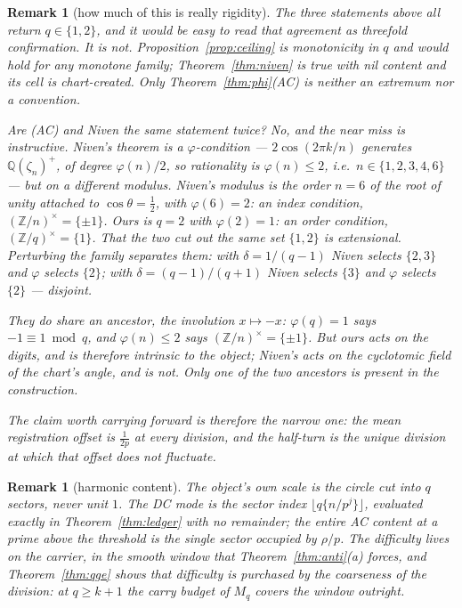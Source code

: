 \documentclass[11pt]{article}
\newtheorem{remark}[theorem]{Remark}
\begin{document}
\begin{remark}[how much of this is really rigidity]\label{rem:deflate}
The three statements above all return $q\in\{1,2\}$, and it would be easy to read that
agreement as threefold confirmation.  It is not.  Proposition~\ref{prop:ceiling} is
monotonicity in $q$ and would hold for any monotone family; Theorem~\ref{thm:niven} is true
with nil content and its cell is chart-created.  Only Theorem~\ref{thm:phi}(AC) is neither an
extremum nor a convention.

Are (AC) and Niven the same statement twice?  \emph{No, and the near miss is instructive.}
Niven's theorem \emph{is} a $\varphi$-condition --- $2\cos(2\pi k/n)$ generates
$\mathbb Q(\zeta_n)^{+}$, of degree $\varphi(n)/2$, so rationality is $\varphi(n)\le2$, i.e.\
$n\in\{1,2,3,4,6\}$ --- but on a \emph{different modulus}.  Niven's modulus is the order
$n=6$ of the root of unity attached to $\cos\theta=\tfrac12$, with $\varphi(6)=2$: an
\emph{index} condition, $(\mathbb Z/n)^{\times}=\{\pm1\}$.  Ours is $q=2$ with
$\varphi(2)=1$: an \emph{order} condition, $(\mathbb Z/q)^{\times}=\{1\}$.  That the two cut
out the same set $\{1,2\}$ is extensional.  Perturbing the family separates them: with
$\delta=1/(q-1)$ Niven selects $\{2,3\}$ and $\varphi$ selects $\{2\}$; with
$\delta=(q-1)/(q+1)$ Niven selects $\{3\}$ and $\varphi$ selects $\{2\}$ --- disjoint.

They do share an ancestor, the involution $x\mapsto-x$: $\varphi(q)=1$ says $-1\equiv1\bmod q$,
and $\varphi(n)\le2$ says $(\mathbb Z/n)^{\times}=\{\pm1\}$.  But ours acts on the digits, and
is therefore intrinsic to the object; Niven's acts on the cyclotomic field of the chart's
angle, and is not.  Only one of the two ancestors is present in the construction.

The claim worth carrying forward is therefore the narrow one: the mean registration offset is
$\tfrac1{2p}$ at every division, and the half-turn is the unique division at which that offset
does not fluctuate.
\end{remark}

\begin{remark}[harmonic content]
The object's own scale is the circle cut into $q$ sectors, never unit $1$.  The DC mode is the
sector index $\lfloor q\{n/p^{j}\}\rfloor$, evaluated exactly in Theorem~\ref{thm:ledger} with
no remainder; the entire AC content at a prime above the threshold is the single sector
occupied by $\rho/p$.  The difficulty lives on the carrier, in the smooth window that
Theorem~\ref{thm:anti}(a) forces, and Theorem~\ref{thm:qge} shows that difficulty is
\emph{purchased by the coarseness of the division}: at $q\ge k+1$ the carry budget of $M_q$
covers the window outright.
\end{remark}
\end{document}
